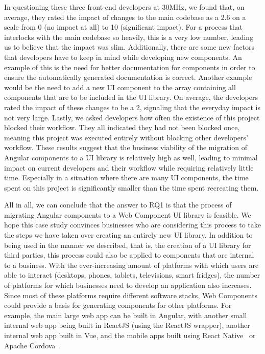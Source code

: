 In questioning these three front-end developers at 30MHz, we found that, on average, they rated the impact of changes to the main codebase as a 2.6 on a scale from 0 (no impact at all) to 10 (significant impact). For a process that interlocks with the main codebase so heavily, this is a very low number, leading us to believe that the impact was slim.
Additionally, there are some new factors that developers have to keep in mind while developing new components. An example of this is the need for better documentation for components in order to ensure the automatically generated documentation is correct. Another example would be the need to add a new UI component to the array containing all components that are to be included in the UI library. On average, the developers rated the impact of these changes to be a 2, signaling that the everyday impact is not very large. Lastly, we asked developers how often the existence of this project blocked their workflow. They all indicated they had not been blocked once, meaning this project was executed entirely without blocking other developers' workflow. These results suggest that the business viability of the migration of Angular components to a UI library is relatively high as well, leading to minimal impact on current developers and their workflow while requiring relatively little time. Especially in a situation where there are many UI components, the time spent on this project is significantly smaller than the time spent recreating them.

All in all, we can conclude that the answer to RQ1 is that the process of migrating Angular components to a Web Component UI library is feasible. We hope this case study convinces businesses who are considering this process to take the steps we have taken over creating an entirely new UI library. In addition to being used in the manner we described, that is, the creation of a UI library for third parties, this process could also be applied to components that are internal to a business. With the ever-increasing amount of platforms with which users are able to interact (desktops, phones, tablets, televisions, smart fridges), the number of platforms for which businesses need to develop an application also increases. Since most of these platforms require different software stacks, Web Components could provide a basis for generating components for other platforms. For example, the main large web app can be built in Angular, with another small internal web app being built in ReactJS (using the ReactJS wrapper), another internal web app built in Vue, and the mobile apps built using React Native~ or Apache Cordova~.

